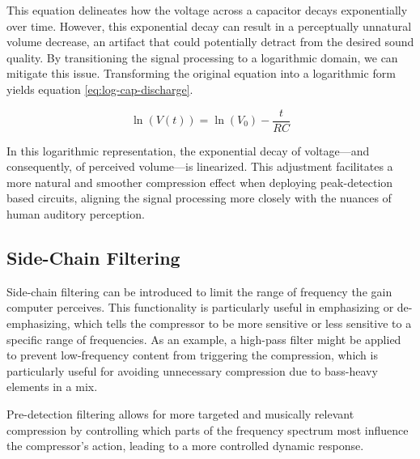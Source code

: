 \documentclass[10pt]{article}
\begin{document}
\begin{multicols*}{2}
                \noindent This equation delineates how the voltage across a capacitor decays exponentially over time. However, this exponential decay can result in a perceptually unnatural volume decrease, an artifact that could potentially detract from the desired sound quality. By transitioning the signal processing to a logarithmic domain, we can mitigate this issue. Transforming the original equation into a logarithmic form yields equation \ref{eq:log-cap-discharge}.
                
                    \begin{equation}\label{eq:log-cap-discharge}
                        \ln(V(t)) = \ln(V_0) - \frac{t}{RC}
                    \end{equation}
                
                \noindent In this logarithmic representation, the exponential decay of voltage—and consequently, of perceived volume—is linearized. This adjustment facilitates a more natural and smoother compression effect when deploying peak-detection based circuits, aligning the signal processing more closely with the nuances of human auditory perception. 
                
            \subsection{Side-Chain Filtering}
                Side-chain filtering can be introduced to limit the range of frequency the gain computer perceives. This functionality is particularly useful in emphasizing or de-emphasizing, which tells the compressor to be more sensitive or less sensitive to a specific range of frequencies.
                As an example, a high-pass filter might be applied to prevent low-frequency content from triggering the compression, which is particularly useful for avoiding unnecessary compression due to bass-heavy elements in a mix. \cite{side-chain-filtering}\par
                Pre-detection filtering allows for more targeted and musically relevant compression by controlling which parts of the frequency spectrum most influence the compressor's action, leading to a more controlled dynamic response.
                

\end{multicols*}
\end{document}
